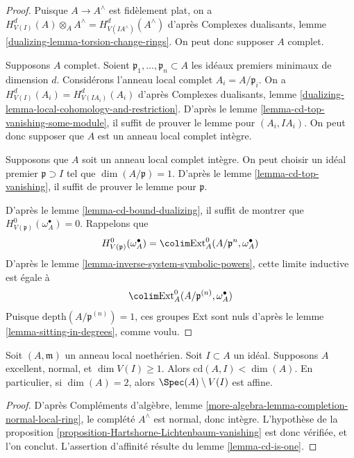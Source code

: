 \begin{proof}
Puisque $A \to A^\wedge$ est fidèlement plat, on a $H^d_{V(I)}(A) \otimes_A A^\wedge = H^d_{V(IA^\wedge)}(A^\wedge)$ d'après Complexes dualisants, lemme \ref{dualizing-lemma-torsion-change-rings}. On peut donc supposer $A$ complet.

\medskip\noindent
Supposons $A$ complet. Soient $\mathfrak p_1, \ldots, \mathfrak p_n \subset A$ les idéaux premiers minimaux de dimension $d$. Considérons l'anneau local complet $A_i = A/\mathfrak p_i$. On a $H^d_{V(I)}(A_i) = H^d_{V(IA_i)}(A_i)$ d'après Complexes dualisants, lemme \ref{dualizing-lemma-local-cohomology-and-restriction}. D'après le lemme \ref{lemma-cd-top-vanishing-some-module}, il suffit de prouver le lemme pour $(A_i, IA_i)$. On peut donc supposer que $A$ est un anneau local complet intègre.

\medskip\noindent
Supposons que $A$ soit un anneau local complet intègre. On peut choisir un idéal premier $\mathfrak p \supset I$ tel que $\dim(A/\mathfrak p) = 1$. D'après le lemme \ref{lemma-cd-top-vanishing}, il suffit de prouver le lemme pour $\mathfrak p$.

\medskip\noindent
D'après le lemme \ref{lemma-cd-bound-dualizing}, il suffit de montrer que $H^0_{V(\mathfrak p)}(\omega_A^\bullet) = 0$. Rappelons que
$$
H^0_{V(\mathfrak p)}(\omega_A^\bullet) =
\colim \text{Ext}^0_A(A/\mathfrak p^n, \omega_A^\bullet)
$$
D'après le lemme \ref{lemma-inverse-system-symbolic-powers}, cette limite inductive est égale à
$$
\colim \text{Ext}^0_A(A/\mathfrak p^{(n)}, \omega_A^\bullet)
$$
Puisque $\text{depth}(A/\mathfrak p^{(n)}) = 1$, ces groupes Ext sont nuls d'après le lemme \ref{lemma-sitting-in-degrees}, comme voulu.
\end{proof}

\begin{lemma}
\label{lemma-affine-complement}
Soit $(A, \mathfrak m)$ un anneau local noethérien. Soit $I \subset A$ un idéal. Supposons $A$ excellent, normal, et $\dim V(I) \geq 1$. Alors $\text{cd}(A, I) < \dim(A)$. En particulier, si $\dim(A) = 2$, alors $\Spec(A) \setminus V(I)$ est affine.
\end{lemma}

\begin{proof}
D'après Compléments d'algèbre, lemme \ref{more-algebra-lemma-completion-normal-local-ring}, le complété $A^\wedge$ est normal, donc intègre. L'hypothèse de la proposition \ref{proposition-Hartshorne-Lichtenbaum-vanishing} est donc vérifiée, et l'on conclut. L'assertion d'affinité résulte du lemme \ref{lemma-cd-is-one}.
\end{proof}
















